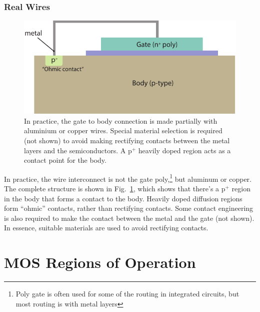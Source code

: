 \subsubsection{Real Wires}
\begin{figure}[tbh]
\begin{center}
\includegraphics[width=.75\columnwidth]{mos_cap_metal_short}
\end{center}
\caption{In practice, the gate to body connection is made partially with aluminium or copper wires.  Special material selection is required (not shown) to avoid making rectifying contacts between the metal layers and the semiconductors.  A p$^+$ heavily doped region acts as a contact point for the body. } \label{fig:mos_cap_gate_body_short_wire}
\end{figure}

In practice, the wire interconnect is not the gate poly,\footnote{Poly gate is often used for some of the routing in integrated circuits, but most routing is with metal layers}  but aluminum or copper.  The complete structure is shown in Fig.~\ref{fig:mos_cap_gate_body_short_wire}, which shows that there's a p$^+$ region in the body that forms a contact to the body.  Heavily doped diffusion regions form “ohmic” contacts, rather than rectifying contacts.   Some contact engineering is also required to make the contact between the metal and the gate (not shown). In essence, suitable materials are used to avoid rectifying contacts.  
\section{MOS Regions of Operation}
